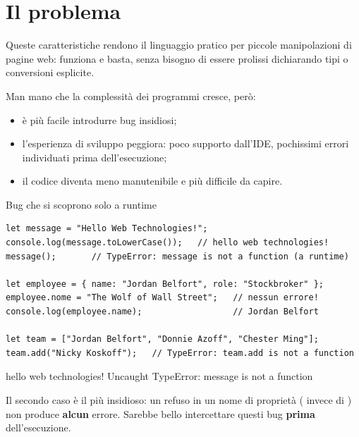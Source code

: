 \section{Il problema}

Queste caratteristiche rendono il linguaggio pratico per piccole manipolazioni
di pagine web: funziona e basta, senza bisogno di essere prolissi dichiarando
tipi o conversioni esplicite.

Man mano che la complessità dei programmi cresce, però:

\begin{itemize}
  \item è più facile introdurre bug insidiosi;
  \item l'esperienza di sviluppo peggiora: poco supporto dall'IDE, pochissimi
        errori individuati prima dell'esecuzione;
  \item il codice diventa meno manutenibile e più difficile da capire.
\end{itemize}

\begin{esempio}{Bug che si scoprono solo a runtime}
\begin{affianco}[0.6][c]
\codicepiccolo
\begin{lstlisting}[style=js, name=bugs.js]
let message = "Hello Web Technologies!";
console.log(message.toLowerCase());   // hello web technologies!
message();       // TypeError: message is not a function (a runtime)

let employee = { name: "Jordan Belfort", role: "Stockbroker" };
employee.nome = "The Wolf of Wall Street";   // nessun errore!
console.log(employee.name);                  // Jordan Belfort

let team = ["Jordan Belfort", "Donnie Azoff", "Chester Ming"];
team.add("Nicky Koskoff");   // TypeError: team.add is not a function
\end{lstlisting}
\risultato
\begin{console}
hello web technologies!
Uncaught TypeError: message is
  not a function
\end{console}
\end{affianco}

Il secondo caso è il più insidioso: un refuso in un nome di proprietà
( invece di ) non produce \textbf{alcun} errore. Sarebbe
bello intercettare questi bug \textbf{prima} dell'esecuzione.
\end{esempio}

